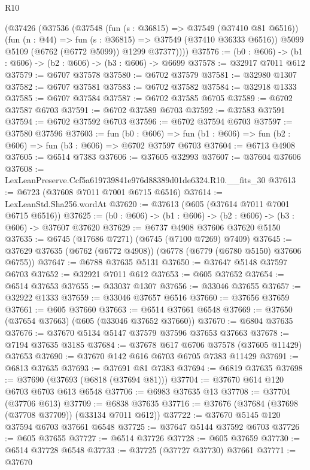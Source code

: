 \begin{lexlean}{R10}
\begin{coremodule}
      (@37426
        (@37536
          (@37548
            (fun (s : @36815) => @37549 (@37410 @81 @6516))
            (fun (n : @44) => fun (s : @36815) => @37549 (@37410 @36333 @6516))
            @5099
            @5109
            (@6762 (@6772 @5099))
            @1299
            @37377))))
@37576 := (b0 : @606) -> (b1 : @606) -> (b2 : @606) -> (b3 : @606) -> @6699
@37578 := @32917 @7011 @612
@37579 := @6707 @37578
@37580 := @6702 @37579
@37581 := @32980 @1307
@37582 := @6707 @37581
@37583 := @6702 @37582
@37584 := @32918 @1333
@37585 := @6707 @37584
@37587 := @6702 @37585 @6705
@37589 := @6702 @37587 @6703
@37591 := @6702 @37589 @6703
@37592 := @37583 @37591
@37594 := @6702 @37592 @6703
@37596 := @6702 @37594 @6703
@37597 := @37580 @37596
@37603 := fun (b0 : @606) =>
  fun (b1 : @606) => fun (b2 : @606) => fun (b3 : @606) => @6702 @37597 @6703
@37604 := @6713 @4908
@37605 := @6514 @7383
@37606 := @37605 @32993
@37607 := @37604 @37606
@37608 := LexLeanPreserve.Ccf5a619739841e976d88389d01de6324.R10.__fits_30
@37613 := @6723 (@37608 @7011 @7001 @6715 @6516)
@37614 := LexLeanStd.Sha256.wordAt
@37620 := @37613 (@605 (@37614 @7011 @7001 @6715 @6516))
@37625 := (b0 : @606) -> (b1 : @606) -> (b2 : @606) -> (b3 : @606) -> @37607 @37620
@37629 := @6737 @4908 @37606 @37620 @5150
@37635 := @6745 (@17686 @7271) (@6745 (@7100 @7269) @7409)
@37645 := @37629 @37635 (@6762 (@6772 @4908)) (@6778 (@6779 (@6780 @5150) @37606 @6755))
@37647 := @6788 @37635 @5131
@37650 := @37647 @5148 @37597 @6703
@37652 := @32921 @7011 @612
@37653 := @605 @37652
@37654 := @6514 @37653
@37655 := @33037 @1307
@37656 := @33046 @37655
@37657 := @32922 @1333
@37659 := @33046 @37657 @6516
@37660 := @37656 @37659
@37661 := @605 @37660
@37663 := @6514 @37661 @6548
@37669 := @37650 (@37654 @37663) (@605 (@33046 @37652 @37660))
@37670 := @6804 @37635
@37676 := @37670 @5134 @5147 @37579 @37596 @37653 @37663
@37678 := @7194 @37635 @3185
@37684 := @37678 @617 @6706 @37578 (@37605 @11429) @37653
@37690 := @37670 @142 @616 @6703 @6705 @7383 @11429
@37691 := @6813 @37635
@37693 := @37691 @81 @7383
@37694 := @6819 @37635
@37698 := @37690 (@37693 (@6818 (@37694 @81)))
@37704 := @37670 @614 @120 @6703 @6703 @613 @6548
@37706 := @6983 @37635 @13
@37708 := @37704 (@37706 @613)
@37709 := @6838 @37635
@37716 := @37676 (@37684 (@37698 (@37708 @37709)) (@33134 @7011 @612))
@37722 := @37670 @5145 @120 @37594 @6703 @37661 @6548
@37725 := @37647 @5144 @37592 @6703
@37726 := @605 @37655
@37727 := @6514 @37726
@37728 := @605 @37659
@37730 := @6514 @37728 @6548
@37733 := @37725 (@37727 @37730) @37661
@37771 := @37670

\end{coremodule}
\end{lexlean}
